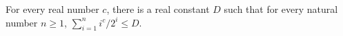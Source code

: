 \begin{theorem}
\label{Randomized.exists_sum_rpow_div_two_pow_le}
\leanok
{}
For every real number $c$, there is a real constant $D$ such that for every natural
number $n \ge 1$, $\sum_{i=1}^{n} i^c / 2^i \le D$.
\end{theorem}
